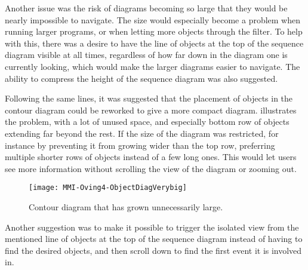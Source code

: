 Another issue was the risk of diagrams becoming so large that they would be nearly impossible to navigate.
The size would especially become a problem when running larger programs, or when letting more objects through the filter.
To help with this, there was a desire to have the line of objects at the top of the sequence diagram visible at all times, regardless of how far down in the diagram one is currently looking, which would make the larger diagrams easier to navigate.
The ability to compress the height of the sequence diagram was also suggested.

Following the same lines, it was suggested that the placement of objects in the contour diagram could be reworked to give a more compact diagram.
 illustrates the problem, with a lot of unused space, and especially bottom row of objects extending far beyond the rest.
If the size of the diagram was restricted, for instance by preventing it from growing wider than the top row, preferring multiple shorter rows of objects instead of a few long ones.
This would let users see more information without scrolling the view of the diagram or zooming out.

\begin{figure}[h]
	\centering
	\texttt{[image: MMI-Oving4-ObjectDiagVerybig]}
	\caption{Contour diagram that has grown unnecessarily large.}
	\label{fig:MMI-Oving4-ObjectDiagVerybig}
\end{figure}

Another suggestion was to make it possible to trigger the isolated view from the mentioned line of objects at the top of the sequence diagram instead of having to find the desired objects, and then scroll down to find the first event it is involved in.
